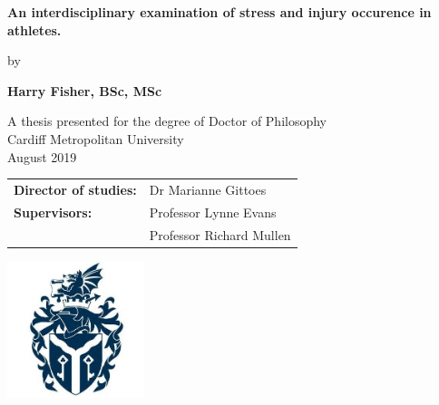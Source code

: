 \documentclass[man,floatsintext]{apa6}
\title{}
\author{\textsuperscript{}}
\date{}
\affiliation{
\vspace{0.5cm}
\textsuperscript{} }
\begin{document}
\clearpage\mbox{}\thispagestyle{empty}\clearpage
\setcounter{page}{1}

\thispagestyle{empty}
    \begin{center}
        \vspace*{0.5cm}
 
        \Large
        \textbf{An interdisciplinary examination of stress and injury occurence in athletes.}
 
        \vspace{0.3cm}
        \large
        
        by
 
        \vspace{0.3cm}
        \Large
        \textbf{Harry Fisher, BSc, MSc}
 
        \vspace{0.3cm}
 
        A thesis presented for the degree of Doctor of Philosophy\\
        Cardiff Metropolitan University\\
        August 2019\\
        
        \vspace{1cm}
                
        \begin{tabular}{ll}
         \textbf{Director of studies:} & Dr Marianne Gittoes\\
         \textbf{Supervisors:} & Professor Lynne Evans\\
         & Professor Richard Mullen\\
         \end{tabular}
        
        \vspace{1cm}
                                  
        \includegraphics[width=0.3\textwidth]{figs/cardiffmetlogo}
 
\end{center}

\clearpage

\setcounter{page}{1}
\end{document}
